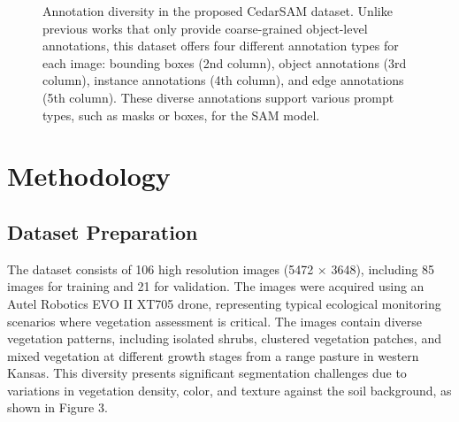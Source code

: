 \documentclass[letterpaper, 10 pt, conference]{ieeeconf}  %
\begin{document}
\begin{figure}[thpb]
  \centering
  \caption{Annotation diversity in the proposed CedarSAM dataset. Unlike previous works that only provide coarse-grained object-level annotations, this dataset offers four different annotation types for each image: bounding boxes (2nd column), object annotations (3rd column), instance annotations (4th column), and edge annotations (5th column). These diverse annotations support various prompt types, such as masks or boxes, for the SAM model.}
  \label{fig:score_distributions}
\end{figure}

\section{Methodology}

\subsection{Dataset Preparation}
The dataset consists of 106 high resolution images (5472 × 3648), including 85 images for training and 21 for validation. The images were acquired using an Autel Robotics EVO II XT705 drone, representing typical ecological monitoring scenarios where vegetation assessment is critical. The images contain diverse vegetation patterns, including isolated shrubs, clustered vegetation patches, and mixed vegetation at different growth stages from a range pasture in western Kansas. This diversity presents significant segmentation challenges due to variations in vegetation density, color, and texture against the soil background, as shown in Figure 3.
\end{document}
